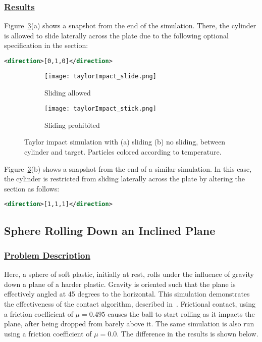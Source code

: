 \subsubsection*{\underline{Results}}
Figure~\ref{fig:taylorImpact}(a) shows a snapshot from the end of the simulation.
There, the cylinder is allowed to slide laterally across the plate due
to the following optional specification in the 
section:

\begin{lstlisting}[language=XML]
        <direction>[0,1,0]</direction>
\end{lstlisting}

\begin{figure}
  \centering
  \begin{subfigure}{0.4\textwidth}
    \centering
    \texttt{[image: taylorImpact\_slide.png]}
    \label{fig:taylorImpact_slide}
    \caption{Sliding allowed}
  \end{subfigure}
  \begin{subfigure}{0.4\textwidth}
    \centering
    \texttt{[image: taylorImpact\_stick.png]}
    \label{fig:taylorImpact_stick}
    \caption{Sliding prohibited}
  \end{subfigure}
  \caption{Taylor impact simulation with (a) sliding (b) no sliding,
           between cylinder and
           target.  Particles colored according to temperature.}
  \label{fig:taylorImpact}
\end{figure}

Figure~\ref{fig:taylorImpact}(b) shows a snapshot from the end of a
similar simulation.  In this case, the cylinder is restricted from sliding
laterally across the plate by altering the 
section as follows:
\begin{lstlisting}[language=XML]
        <direction>[1,1,1]</direction>
\end{lstlisting}

\newpage
\subsection*{\center Sphere Rolling Down an Inclined Plane}
\subsubsection*{\underline{Problem Description}}
Here, a sphere of soft plastic, initially at rest, rolls under the
influence of gravity down a plane of a harder plastic.  Gravity is
oriented such that the plane is effectively angled at 45 degrees to
the horizontal.  This simulation demonstrates the effectiveness of
the contact algorithm, described in~\cite{Bard2001}.  Frictional
contact, using a friction coefficient of $\mu = 0.495$ causes the ball
to start rolling as it impacts the plane, after being dropped from
barely above it.  The same simulation is also run using a friction
coefficient of $\mu = 0.0$.  The difference in the results is shown
below.
 
